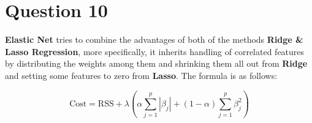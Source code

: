 \documentclass[a4paper,12pt]{article}
\begin{document}
\section*{Question 10}
\textbf{Elastic Net} tries to combine the advantages of both of the methods \textbf{Ridge \& Lasso Regression}, more specifically, it inherits handling of correlated features by distributing
the weights among them and shrinking them all out from \textbf{Ridge} and setting some features to zero from \textbf{Lasso}. The formula is as follows:

\[
\text{Cost} = \text{RSS} + \lambda \left( \alpha \sum_{j=1}^p |\beta_j| + (1-\alpha) \sum_{j=1}^p \beta_j^2 \right)
\]
\end{document}
